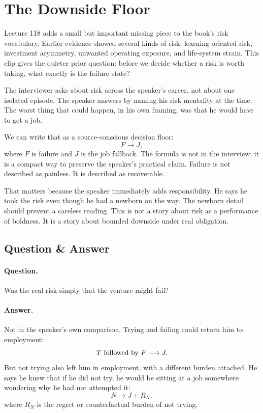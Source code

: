 \documentclass[11pt,oneside]{book}
\begin{document}

\section{The Downside Floor}

Lecture 118 adds a small but important missing piece to the book's risk vocabulary. Earlier evidence showed several kinds of risk: learning-oriented risk, investment asymmetry, unwanted operating exposure, and life-system strain. This clip gives the quieter prior question: before we decide whether a risk is worth taking, what exactly is the failure state?

The interviewer asks about risk across the speaker's career, not about one isolated episode. The speaker answers by naming his risk mentality at the time. The worst thing that could happen, in his own framing, was that he would have to get a job.

We can write that as a source-conscious decision floor:
\[
F \longrightarrow J,
\]
where \(F\) is failure and \(J\) is the job fallback. The formula is not in the interview; it is a compact way to preserve the speaker's practical claim. Failure is not described as painless. It is described as recoverable.

That matters because the speaker immediately adds responsibility. He says he took the risk even though he had a newborn on the way. The newborn detail should prevent a careless reading. This is not a story about risk as a performance of boldness. It is a story about bounded downside under real obligation.

\subsection{Question \& Answer}

\paragraph{Question.}
Was the real risk simply that the venture might fail?

\paragraph{Answer.}
Not in the speaker's own comparison. Trying and failing could return him to employment:
\[
T \ \hbox{followed by} \ F \longrightarrow J.
\]
But not trying also left him in employment, with a different burden attached. He says he knew that if he did not try, he would be sitting at a job somewhere wondering why he had not attempted it:
\[
N \longrightarrow J + R_N,
\]
where \(R_N\) is the regret or counterfactual burden of not trying.
\end{document}
